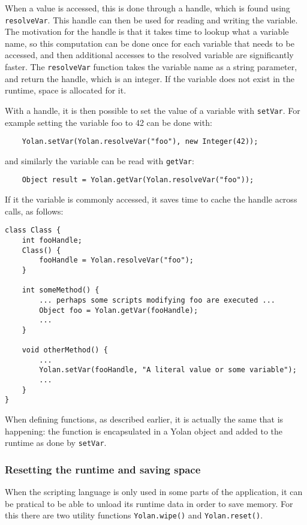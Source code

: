 \documentclass[11pt]{report}
\begin{document}
When a value is accessed, this is done through a handle, which is found using \verb|resolveVar|. This handle can then be used for reading and writing the variable. The motivation for the handle is that it takes time to lookup what a variable name, so this computation can be done once for each variable that needs to be accessed, and then additional accesses to the resolved variable are significantly faster. The \verb|resolveVar| function takes the variable name as a string parameter, and return the handle, which is an integer. If the variable does not exist in the runtime, space is allocated for it.

With a handle, it is then possible to set the value of a variable with \verb|setVar|. For example setting the variable foo to 42 can be done with:
\begin{lstlisting}
    Yolan.setVar(Yolan.resolveVar("foo"), new Integer(42));
\end{lstlisting} 
and similarly the variable can be read with \verb|getVar|:
\begin{lstlisting}
    Object result = Yolan.getVar(Yolan.resolveVar("foo"));
\end{lstlisting}

If it the variable is commonly accessed, it saves time to cache the handle across calls, as follows:
\begin{lstlisting}
class Class {
    int fooHandle;
    Class() {
        fooHandle = Yolan.resolveVar("foo");
    }

    int someMethod() {
        ... perhaps some scripts modifying foo are executed ...
        Object foo = Yolan.getVar(fooHandle);
        ...
    }

    void otherMethod() {
        ... 
        Yolan.setVar(fooHandle, "A literal value or some variable");
        ...
    }
}
\end{lstlisting}
When defining functions, as described earlier, it is actually the same that is happening: the function is encapsulated in a Yolan object and added to the runtime as done by \verb|setVar|.

\subsubsection{Resetting the runtime and saving space}
When the scripting language is only used in some parts of the application, it can be pratical to be able to unload its runtime data in order to save memory. 
For this there are two utility functions \verb|Yolan.wipe()| and \verb|Yolan.reset()|.
\end{document}
